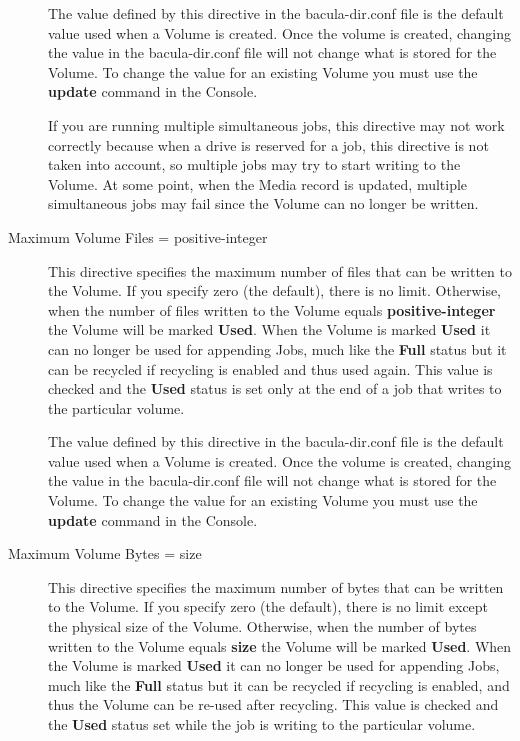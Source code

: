 \begin{description}
   The value defined by this directive in the  bacula-dir.conf
   file is the default value used when a Volume  is created. Once the volume is
   created, changing the value  in the bacula-dir.conf file will not change what
   is stored  for the Volume. To change the value for an existing Volume  you
   must use the {\bf update} command in the Console.  

   If you are running multiple simultaneous jobs, this directive may not
   work correctly because when a drive is reserved for a job, this
   directive is not taken into account, so multiple jobs may try to 
   start writing to the Volume. At some point, when the Media record is
   updated, multiple simultaneous jobs may fail since the Volume can no
   longer be written.

\item [Maximum Volume Files = \lt{}positive-integer\gt{}]
   This directive specifies the maximum number of files that can be written
   to the Volume.  If you specify zero (the default), there is no limit.
   Otherwise, when the number of files written to the Volume equals {\bf
   positive-integer} the Volume will be marked {\bf Used}.  When the Volume
   is marked {\bf Used} it can no longer be used for appending Jobs, much
   like the {\bf Full} status but it can be recycled if recycling is
   enabled and thus used again.  This value is checked and the {\bf Used}
   status is set only at the end of a job that writes to the particular
   volume.

   The value defined by this directive in the bacula-dir.conf file is the
   default value used when a Volume is created.  Once the volume is
   created, changing the value in the bacula-dir.conf file will not change
   what is stored for the Volume.  To change the value for an existing
   Volume you must use the {\bf update} command in the Console.

\item [Maximum Volume Bytes = \lt{}size\gt{}]
   This directive specifies the maximum number of bytes that can be written
   to the Volume.  If you specify zero (the default), there is no limit
   except the physical size of the Volume.  Otherwise, when the number of
   bytes written to the Volume equals {\bf size} the Volume will be marked
   {\bf Used}.  When the Volume is marked {\bf Used} it can no longer be
   used for appending Jobs, much like the {\bf Full} status but it can be
   recycled if recycling is enabled, and thus the Volume can be re-used
   after recycling.  This value is checked and the {\bf Used} status set
   while the job is writing to the particular volume.


\end{description}
